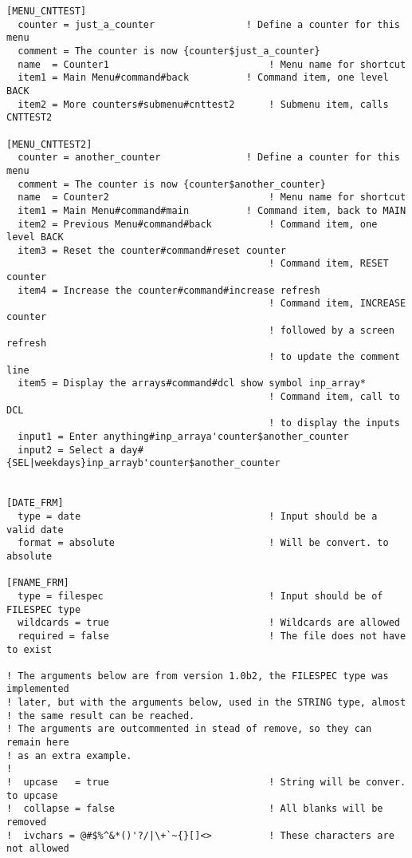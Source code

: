 \documentclass[a4paper]{book}
\begin{document}
\begin{verbatim}
[MENU_CNTTEST]
  counter = just_a_counter   		      ! Define a counter for this menu
  comment = The counter is now {counter$just_a_counter}
  name  = Counter1                            ! Menu name for shortcut
  item1 = Main Menu#command#back	      ! Command item, one level BACK
  item2 = More counters#submenu#cnttest2      ! Submenu item, calls CNTTEST2

[MENU_CNTTEST2]
  counter = another_counter	      	      ! Define a counter for this menu
  comment = The counter is now {counter$another_counter}
  name  = Counter2                            ! Menu name for shortcut
  item1 = Main Menu#command#main	      ! Command item, back to MAIN
  item2 = Previous Menu#command#back	      ! Command item, one level BACK
  item3 = Reset the counter#command#reset counter
                                              ! Command item, RESET counter
  item4 = Increase the counter#command#increase refresh
                                              ! Command item, INCREASE counter
                                              ! followed by a screen refresh
                                              ! to update the comment line
  item5 = Display the arrays#command#dcl show symbol inp_array*
                                              ! Command item, call to DCL
                                              ! to display the inputs
  input1 = Enter anything#inp_arraya'counter$another_counter
  input2 = Select a day#{SEL|weekdays}inp_arrayb'counter$another_counter


[DATE_FRM]
  type = date                                 ! Input should be a valid date
  format = absolute                           ! Will be convert. to absolute

[FNAME_FRM]
  type = filespec                             ! Input should be of FILESPEC type
  wildcards = true                            ! Wildcards are allowed
  required = false                            ! The file does not have to exist

! The arguments below are from version 1.0b2, the FILESPEC type was implemented
! later, but with the arguments below, used in the STRING type, almost
! the same result can be reached.
! The arguments are outcommented in stead of remove, so they can remain here
! as an extra example.
! 
!  upcase   = true                            ! String will be conver. to upcase
!  collapse = false                           ! All blanks will be removed
!  ivchars = @#$%^&*()'?/|\+`~{}[]<>          ! These characters are not allowed



\end{verbatim}
\end{document}
